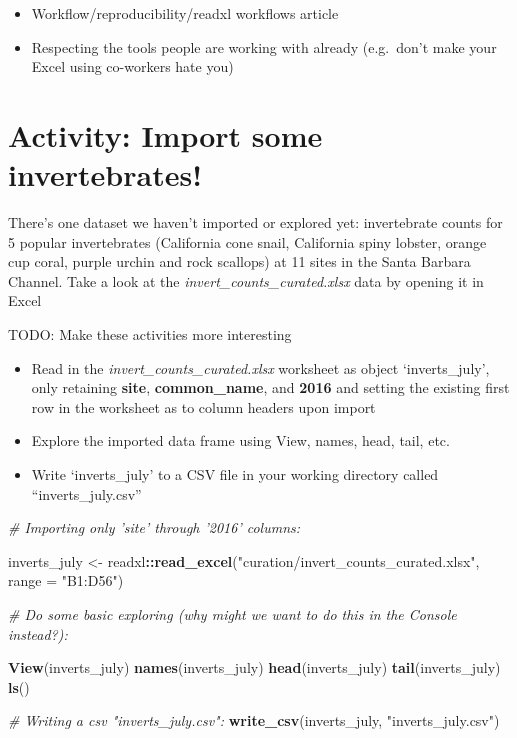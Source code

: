 \documentclass[]{book}
\newenvironment{Shaded}{\begin{snugshade}}{\end{snugshade}}
\newcommand{\CommentTok}[1]{\textcolor[rgb]{0.56,0.35,0.01}{\textit{#1}}}
\newcommand{\DataTypeTok}[1]{\textcolor[rgb]{0.13,0.29,0.53}{#1}}
\newcommand{\KeywordTok}[1]{\textcolor[rgb]{0.13,0.29,0.53}{\textbf{#1}}}
\newcommand{\NormalTok}[1]{#1}
\newcommand{\OperatorTok}[1]{\textcolor[rgb]{0.81,0.36,0.00}{\textbf{#1}}}
\newcommand{\StringTok}[1]{\textcolor[rgb]{0.31,0.60,0.02}{#1}}
\providecommand{\tightlist}{%
  \setlength{\itemsep}{0pt}\setlength{\parskip}{0pt}}
\begin{document}
\begin{itemize}
\tightlist
\item
  Workflow/reproducibility/readxl workflows article
\item
  Respecting the tools people are working with already (e.g.~don't make your Excel using co-workers hate you)
\end{itemize}

\hypertarget{activity-import-some-invertebrates}{%
\section{Activity: Import some invertebrates!}\label{activity-import-some-invertebrates}}

There's one dataset we haven't imported or explored yet: invertebrate counts for 5 popular invertebrates (California cone snail, California spiny lobster, orange cup coral, purple urchin and rock scallops) at 11 sites in the Santa Barbara Channel. Take a look at the \emph{invert\_counts\_curated.xlsx} data by opening it in Excel

TODO: Make these activities more interesting

\begin{itemize}
\tightlist
\item
  Read in the \emph{invert\_counts\_curated.xlsx} worksheet as object `inverts\_july', only retaining \textbf{site}, \textbf{common\_name}, and \textbf{2016} and setting the existing first row in the worksheet as to column headers upon import
\item
  Explore the imported data frame using View, names, head, tail, etc.
\item
  Write `inverts\_july' to a CSV file in your working directory called ``inverts\_july.csv''
\end{itemize}

\begin{Shaded}
\begin{Highlighting}[]
\CommentTok{# Importing only 'site' through '2016' columns: }

\NormalTok{inverts_july <-}\StringTok{ }\NormalTok{readxl}\OperatorTok{::}\KeywordTok{read_excel}\NormalTok{(}\StringTok{"curation/invert_counts_curated.xlsx"}\NormalTok{, }\DataTypeTok{range =} \StringTok{"B1:D56"}\NormalTok{)}

\CommentTok{# Do some basic exploring (why might we want to do this in the Console instead?):}

\KeywordTok{View}\NormalTok{(inverts_july)}
\KeywordTok{names}\NormalTok{(inverts_july)}
\KeywordTok{head}\NormalTok{(inverts_july)}
\KeywordTok{tail}\NormalTok{(inverts_july)}
\KeywordTok{ls}\NormalTok{()}

\CommentTok{# Writing a csv "inverts_july.csv":}
\KeywordTok{write_csv}\NormalTok{(inverts_july, }\StringTok{"inverts_july.csv"}\NormalTok{)}
\end{Highlighting}
\end{Shaded}
\end{document}
